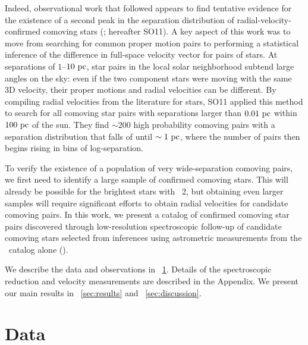 \documentclass[modern, letterpaper]{aastex61}
\newcommand{\gaia}{\project{Gaia}}
\newcommand{\DR}[1]{\acronym{DR}#1}
\newcommand{\tgas}{\acronym{TGAS}}
\begin{document}
Indeed, observational work that followed appears to find tentative evidence for
the existence of a second peak in the separation distribution of
radial-velocity-confirmed comoving stars (\citealt{Shaya:2011}; hereafter SO11).
A key aspect of this work was to move from searching for common proper motion
pairs to performing a statistical inference of the difference in full-space
velocity vector for pairs of stars.
At separations of $1$--$10~\mathrm{pc}$, star pairs in the local solar neighborhood
subtend large angles on the sky: even if the two component stars were moving
with the same 3D velocity, their proper motions and radial velocities can be
different.
By compiling radial velocities from the literature for 
stars, SO11 applied this method to search for all comoving star pairs with
separations larger than $0.01~\mathrm{pc}$ within $100~\mathrm{pc}$ of the sun.
They find $\sim 200$ high probability comoving pairs with a separation
distribution that falls of until $\sim 1~\mathrm{pc}$, where the number of pairs then
begins rising in bins of log-separation.

To verify the existence of a population of very wide-separation comoving pairs,
we first need to identify a large sample of confirmed comoving stars.
This will already be possible for the brightest stars with \gaia\ \DR{2}, but
obtaining even larger samples will require significant efforts to obtain radial
velocities for candidate comoving pairs.
In this work, we present a catalog of confirmed comoving star pairs discovered
through low-resolution spectroscopic follow-up of candidate comoving stars
selected from inferences using astrometric measurements from the \tgas\ catalog
alone (\citealt{Oh:2017}).

We describe the data and observations in \sectionname~\ref{sec:data}.
Details of the spectroscopic reduction and velocity measurements are described
in the Appendix.
We present our main results in \sectionname~\ref{sec:results} and
\sectionname~\ref{sec:discussion}.

\section{Data}\label{sec:data}
\end{document}
